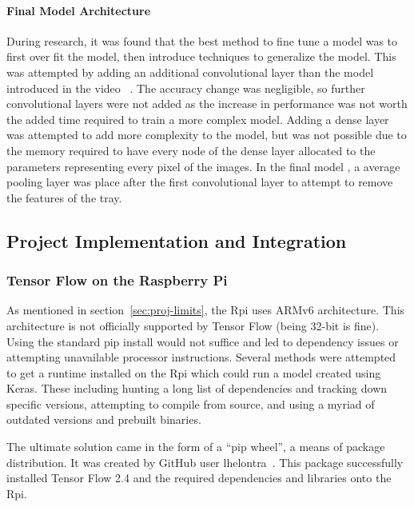 \documentclass[11pt]{article}
\begin{document}
                \paragraph{Final Model Architecture}
                During research, it was found that the best method to fine tune a model was to first over fit the model, then introduce techniques to generalize the model. This was attempted by adding an additional convolutional layer than the model introduced in the video ~\cite{saif}. The accuracy change was negligible, so further convolutional layers were not added as the increase in performance was not worth the added time required to train a more complex model. Adding a dense layer was attempted to add more complexity to the model, but was not possible due to the memory required to have every node of the dense layer allocated to the parameters representing every pixel of the images. In the final model , a average pooling layer was place after the first convolutional layer to attempt to remove the features of the tray. 

        \subsection{Project Implementation and Integration}
            \subsubsection{Tensor Flow on the Raspberry Pi}
                As mentioned in section~\ref{sec:proj-limits}, the Rpi uses ARMv6 architecture. This architecture is not officially supported by Tensor Flow (being 32-bit is fine). Using the standard pip install would not suffice and led to dependency issues or attempting unavailable processor instructions. Several methods were attempted to get a runtime installed on the Rpi which could run a model created using Keras. These including hunting a long list of dependencies and tracking down specific versions, attempting to compile from source, and using a myriad of outdated versions and prebuilt binaries. 
                
                The ultimate solution came in the form of a ``pip wheel'', a means of package distribution. It was created by GitHub user lhelontra~\cite{lontra}. This package successfully installed Tensor Flow 2.4 and the required dependencies and libraries onto the Rpi.
\end{document}
